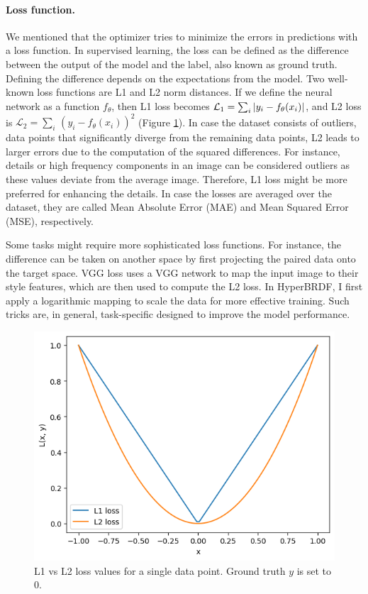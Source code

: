 \paragraph{Loss function.} We mentioned that the optimizer tries to minimize the errors in predictions with a loss function. In supervised learning, the loss can be defined as the difference between the output of the model and the label, also known as ground truth. Defining the difference depends on the expectations from the model. Two well-known loss functions are L1 and L2 norm distances. If we define the neural network as a function $f_\theta$, then L1 loss becomes $\mathcal{L}_{1} = \sum_i \,\lvert y_i - f_\theta(x_i)\rvert$, and L2 loss is $\mathcal{L}_{2} = \sum_i \, (y_i - f_\theta(x_i))^2$ (Figure \ref{fig:l1vsl2loss}).  In case the dataset consists of outliers, data points that significantly diverge from the remaining data points, L2 leads to larger errors due to the computation of the squared differences. For instance, details or high frequency components in an image can be considered outliers as these values deviate from the average image. Therefore, L1 loss might be more preferred for enhancing the details. In case the losses are averaged over the dataset, they are called Mean Absolute Error (MAE) and Mean Squared Error (MSE), respectively.

Some tasks might require more sophisticated loss functions. For instance, the difference can be taken on another space by first projecting the paired data onto the target space. VGG loss \cite{johnson2016perceptuallossesrealtimestyle} uses a VGG network to map the input image to their style features, which are then used to compute the L2 loss. In HyperBRDF, I first apply a logarithmic mapping to scale the data for more effective training. Such tricks are, in general, task-specific designed to improve the model performance.

\begin{figure}[ht]
  \centering
   \includegraphics[width=0.4\linewidth]{Images/l1vsl2loss.png}
   \caption{L1 vs L2 loss values for a single data point. Ground truth $y$ is set to 0.}
   \label{fig:l1vsl2loss}
\end{figure}

